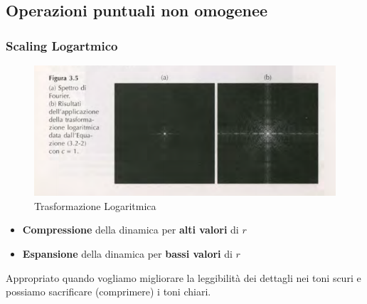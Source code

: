 \documentclass[12pt]{article}
\begin{document}
\subsection{Operazioni puntuali non omogenee}
\subsubsection{Scaling Logartmico}
\begin{figure}[!htb]
    \centering
    \includegraphics[width=1\textwidth]{Images/log.png}
    \caption{Trasformazione Logaritmica}
\end{figure}
\FloatBarrier
\begin{itemize}
    \item \textbf{Compressione} della dinamica per \textbf{alti valori} di $r$
    \item \textbf{Espansione} della dinamica per \textbf{bassi valori} di $r$
\end{itemize}
Appropriato quando vogliamo migliorare la leggibilità dei dettagli nei toni scuri e possiamo sacrificare (comprimere) i toni chiari. 
\end{document}
